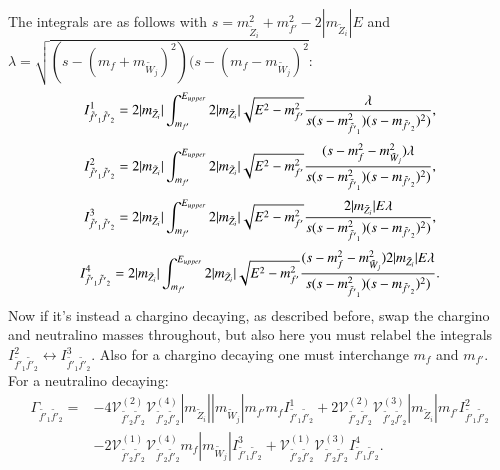 \documentclass[final,3p,times]{elsarticle}
\begin{document}
The integrals are as follows with $s = m_{\tilde{Z}_i}^2 + m_{f'}^2 - 2|m_{\tilde{Z}_i}|E$ and $\lambda = \sqrt{(s-(m_{f}+m_{\tilde{W}_j})^2)(s-(m_{f}-m_{\tilde{W}_j})^2}$:
\begin{equation}
I_{\tilde{f'}_1 \tilde{f'}_2}^{1} = 2|m_{\tilde{Z}_i}| \int_{m_{f'}}^{E_{upper}} 2|m_{\tilde{Z}_i}|\sqrt{E^2-m_{f'}^2} {\lambda \over s(s-m_{\tilde{f'}_1}^2)(s-m_{\tilde{f'}_2})^2)},
\end{equation}
\begin{equation}
I_{\tilde{f'}_1 \tilde{f'}_2}^{2} = 2|m_{\tilde{Z}_i}| \int_{m_{f'}}^{E_{upper}} 2|m_{\tilde{Z}_i}|\sqrt{E^2-m_{f'}^2} {(s-m_{f}^2-m_{\tilde{W}_j}^2)\lambda \over s(s-m_{\tilde{f'}_1}^2)(s-m_{\tilde{f'}_2})^2)},
\end{equation}
\begin{equation}
I_{\tilde{f'}_1 \tilde{f'}_2}^{3} = 2|m_{\tilde{Z}_i}| \int_{m_{f'}}^{E_{upper}} 2|m_{\tilde{Z}_i}|\sqrt{E^2-m_{f'}^2} {2|m_{\tilde{Z}_i}|E \lambda \over s(s-m_{\tilde{f'}_1}^2)(s-m_{\tilde{f'}_2})^2)},
\end{equation}
\begin{equation}
I_{\tilde{f'}_1 \tilde{f'}_2}^{4} = 2|m_{\tilde{Z}_i}| \int_{m_{f'}}^{E_{upper}} 2|m_{\tilde{Z}_i}|\sqrt{E^2-m_{f'}^2}{(s-m_{f}^2-m_{\tilde{W}_j}^2)2|m_{\tilde{Z}_i}|E \lambda \over s(s-m_{\tilde{f'}_1}^2)(s-m_{\tilde{f'}_2})^2)}.
\end{equation}
Now if it's instead a chargino decaying, as described before, swap the chargino and neutralino masses throughout, but also here you must relabel the integrals $I_{\tilde{f'}_1 \tilde{f'}_2}^{2} \leftrightarrow I_{\tilde{f'}_1 \tilde{f'}_2}^{3}$. Also for a chargino decaying one must interchange $m_f$ and $m_{f'}$. For a neutralino decaying:
\begin{equation}
\begin{aligned}
\Gamma_{\tilde{f'}_1 \tilde{f'}_2} = & -4 \mathcal{V}_{\tilde{f'}_2 \tilde{f'}_2}^{(2)} \mathcal{V}_{\tilde{f'}_2 \tilde{f'}_2}^{(4)} |m_{\tilde{Z}_i}||m_{\tilde{W}_j}|m_{f'}m_{f} I_{\tilde{f'}_1 \tilde{f'}_2}^{1} + 2 \mathcal{V}_{\tilde{f'}_2 \tilde{f'}_2}^{(2)} \mathcal{V}_{\tilde{f'}_2 \tilde{f'}_2}^{(3)}|m_{\tilde{Z}_i}|m_{f'} I_{\tilde{f'}_1 \tilde{f'}_2}^{2} \\ & - 2 \mathcal{V}_{\tilde{f'}_2 \tilde{f'}_2}^{(1)} \mathcal{V}_{\tilde{f'}_2 \tilde{f'}_2}^{(4)} m_{f}|m_{\tilde{W}_j}| I_{\tilde{f'}_1 \tilde{f'}_2}^{3} + \mathcal{V}_{\tilde{f'}_2 \tilde{f'}_2}^{(1)} \mathcal{V}_{\tilde{f'}_2 \tilde{f'}_2}^{(3)} I_{\tilde{f'}_1 \tilde{f'}_2}^{4}.
\end{aligned}
\end{equation}
\end{document}
